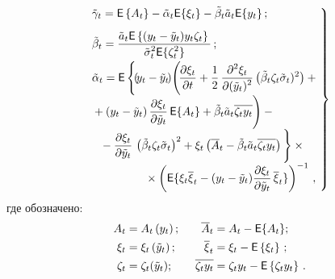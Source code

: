 \begin{multicols}{2}
\noindent
     \begin{equation}
     \left.
     \begin{array}{l}
     \hspace*{-2.5mm}\tilde{\gamma}_t={\sf E}\left\{A_t\right\} - \tilde{\alpha}_t {\sf E}\{\xi_t\} -
\tilde{\beta}_t\tilde{a}_t {\sf E}\{y_t\}\,;\\[9pt]
  \hspace*{-2.5mm} \tilde{\beta}_t= \fr{\tilde{a}_t {\sf E}\left\{(y_t-\tilde{y}_t) y_t 
\zeta_t\right\}}{\tilde{\sigma}_t^2 {\sf E}\{\zeta_t^2\}}\,;\\[9pt]
    \hspace*{-2.5mm} \tilde{\alpha}_t= {\sf E}\left\{\!\left(\!
y_t-\tilde{y}_t\!\right)\! \Bigg(\!\fr{\partial \xi_t}{\partial t} +
\fr{1}{2}\,\fr{\partial^2\xi_t}{\partial 
(\tilde{y}_t)^2}\left(\tilde{\beta}_t\zeta_t \tilde{\sigma}_t)^2\right)+ {}\right.\\[6pt]
\hspace*{-2.5mm}{}+\left(y_t-\tilde{y}_t\right) 
\fr{\partial \xi_t}{\partial \tilde{y}_t}\,{\sf E}\{A_t\} +
\tilde{\beta}_t 
\tilde{a}_t\overline{\zeta_t y_t}\Bigg)-{}\\[6pt]
{}-\fr{\partial \xi_t}{\partial 
\tilde{y}_t}\,\left(\tilde{\beta}_t\zeta_t\tilde{\sigma}_t\right)^2+
\xi_t\left(\overline{A}_t-
\tilde{\beta}_t\tilde{a}_t \overline{\zeta_t y_t}
\right)\Bigg\}\times{}\\[6pt]
\hspace*{14mm}{}\times
\left(
{\sf E}\{ \xi_t \overline{\xi}_t-(y_t- \tilde{y}_t)
\fr{\partial \xi_t}{\partial \tilde{y}_t}\,\overline{\xi}_t\}\right)^{-1}\,,
     \end{array}\!\!\!
     \right\}\!\!
     \label{e13-bos}
     \end{equation}
где обозначено: 
\begin{alignat*}{2}
A_t&= A_t\left(y_t\right);&\enskip \overline{A}_t&=A_t- {\sf E}\{A_t\};\\ 
\xi_t&= \xi_t\left(\tilde{y}_t\right);&\enskip \overline{\xi}_t&=\xi_t- 
{\sf E}\left\{\xi_t\right\}\,;\\
\zeta_t&= \zeta_t(\tilde{y}_t);&\enskip 
\overline{\zeta_t y_t}&= \zeta_t y_t- {\sf E}\left\{\zeta_t y_t\right\}\,.
\end{alignat*}
     

\end{multicols}
